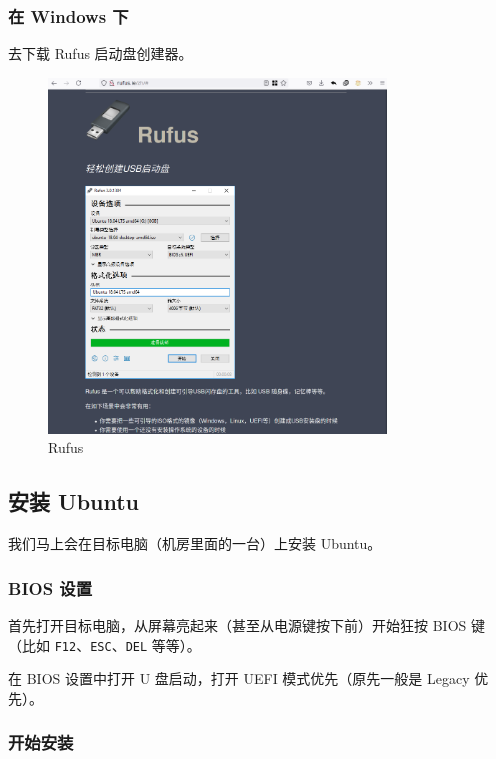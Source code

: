 \documentclass[UTF-8]{ctexart}
\begin{document}
			\subsubsection{在 Windows 下}
			
				去下载 Rufus 启动盘创建器。
				
				\begin{figure}[H]
					\centering
					\includegraphics[width=0.8\textwidth]{fig/rufus.png}
					\caption*{Rufus}
				\end{figure}
			
		\subsection{安装 Ubuntu}
		
			我们马上会在目标电脑（机房里面的一台）上安装 Ubuntu。
		
			\subsubsection{BIOS 设置}
			
				首先打开目标电脑，从屏幕亮起来（甚至从电源键按下前）开始狂按 BIOS 键（比如 \texttt{F12}、\texttt{ESC}、\texttt{DEL} 等等）。
				
				在 BIOS 设置中打开 U 盘启动，打开 UEFI 模式优先（原先一般是 Legacy 优先）。
			
			\subsubsection{开始安装}
				
\end{document}
